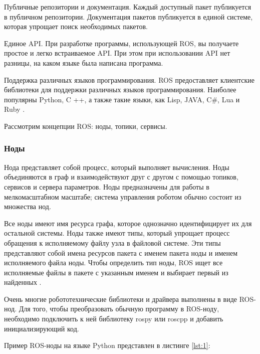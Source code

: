 Публичные репозитории и документация. Каждый доступный пакет публикуется в публичном репозитории. Документация пакетов публикуется в единой системе, которая упрощает поиск необходимых пакетов.

Единое API. При разработке программы, использующей ROS, вы получаете простое и легко встраиваемое API. При этом при использовании API нет разницы, на каком языке была написана программа.

Поддержка различных языков программирования. ROS предоставляет клиентские библиотеки для поддержки различных языков программирования. Наиболее популярны Python, C ++, а также такие языки, как Lisp, JAVA, C\#, Lua и Ruby \cite{voltbro}.

Рассмотрим концепции ROS: ноды, топики, сервисы.

\subsubsection{Ноды}
Нода представляет собой процесс, который выполняет вычисления. Ноды объединяются в граф и взаимодействуют друг с другом с помощью топиков, сервисов и сервера параметров. Ноды предназначены для работы в мелкомасштабном масштабе; система управления роботом обычно состоит из множества нод.

Все ноды имеют имя ресурса графа, которое однозначно идентифицирует их для остальной системы. Ноды также имеют типы, который упрощает процесс обращения к исполняемому файлу узла в файловой системе. Эти типы представляют собой имена ресурсов пакета с именем пакета ноды и именем исполняемого файла ноды. Чтобы определить тип ноды, ROS ищет все исполняемые файлы в пакете с указанным именем и выбирает первый из найденных \cite{ros}. 


Очень многие робототехнические библиотеки и драйвера выполнены в виде ROS-нод.
Для того, чтобы преобразовать обычную программу в ROS-ноду, необходимо подключить к ней библиотеку rospy или roscpp и добавить инициализирующий код.

Пример ROS-ноды на языке Python представлен в листинге \ref{lst:1}:

